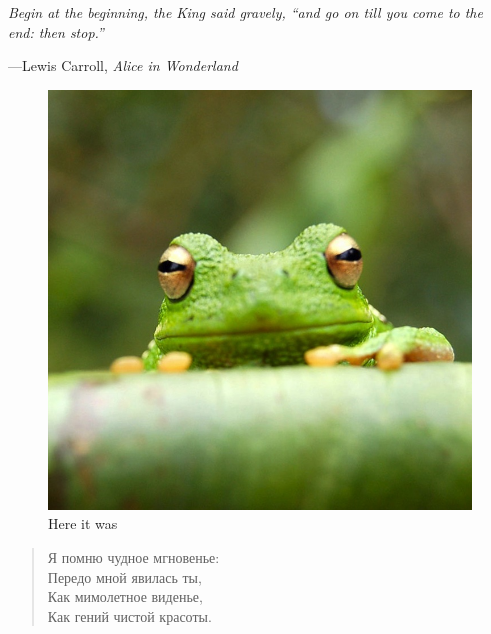 \documentclass{article}
\begin{document}
\setlength{}
\setlength\epigraphrule{0pt}


\epigraph{\itshape Begin at the beginning, the King said gravely, ``and go on till you come to the end: then stop.''}{---Lewis Carroll, \textit{Alice in Wonderland}}

\begin{figure}
    \centering
    \includegraphics[scale=.2]{frog.jpg}
    \caption{Here it was}
    \label{frog}
\end{figure}

\begin{quote}
  Я помню чудное мгновенье:\\
  Передо мной явилась ты,\\
  Как мимолетное виденье,\\
  Как гений чистой красоты.
\end{quote}
\end{document}
